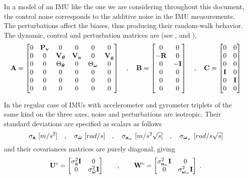 In a model of an IMU like the one we are considering throughout this document, the control noise corresponds to the additive noise in the IMU measurements. 
The perturbations affect the biases, thus producing their random-walk behavior. 
The dynamic, control and perturbation matrices are (see  ,  and ),
%
\begin{equation}
\label{equ:IMU_ABC}
{\bf A} = \begin{bmatrix}
  0& {\bf P}_{\bf v}&  0&  0&  0&  0\\
  0&  0& {\bf V}_{\bm \theta}& {\bf V}_{\bf a}&  0& {\bf V}_{\bf g}\\
  0&  0& \Theta_{\bm \theta}&  0& \Theta_{\bm \omega}&  0\\
  0&  0&  0&  0&  0&  0\\
  0&  0&  0&  0&  0&  0\\
  0&  0&  0&  0&  0&  0
\end{bmatrix}
\quad,\quad
{\bf B} = \begin{bmatrix}
0 & 0 \\
-{\bf R} & 0 \\
0 & -{\bf I} \\
0 & 0 \\
0 & 0 \\
0 & 0 \\
\end{bmatrix}
\quad,\quad
{\bf C} = \begin{bmatrix}
0 & 0 \\
0 & 0 \\
0 & 0 \\
{\bf I} & 0 \\
0 & {\bf I} \\
0 & 0 \\
\end{bmatrix}
\end{equation}

In the regular case of IMUs with accelerometer and gyrometer triplets of the same kind on the three axes, noise and perturbations are isotropic. 
Their standard deviations are specified as scalars as follows
%
\begin{equation}
\sigma_{\tilde\bfa}\ [m/s^2] \quad,\quad \sigma_{\tilde\bfomega} \  [rad/s] \quad,\quad \sigma_{\bfa_w}\ [m/s^2\sqrt{s}] \quad,\quad \sigma_{\bfomega_w}\ [rad/s\sqrt{s}]
\end{equation}
%
and their covariances matrices are purely diagonal, giving
%
\begin{equation}
{\bf U}^c=\begin{bmatrix}
\sigma_{\tilde{{\bf a}}}^2{\bf I} & 0 \\ 0 & \sigma_{\tilde{{\bm \omega}}}^2{\bf I}  
\end{bmatrix} \qquad ,\qquad
{\bf W}^c=\begin{bmatrix}
\sigma_{{\bf a}_w}^2{\bf I} & 0 \\ 0 & \sigma_{{\bm \omega}_w}^2{\bf I}  
\end{bmatrix} ~.
\end{equation}

